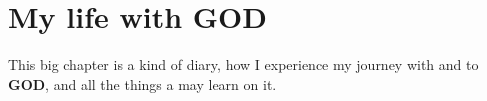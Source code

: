 \documentclass[12pt,a4paper]{article}
\newcommand{\God}[0]{\textbf{GOD}}
\newcommand{\Jesus}[0]{\textbf{JESUS}}
\newcommand{\q}[1]{\char"22{#1}\char"22 }
\begin{document}
	\section{My life with {\God}} \label{MeinLebenMitGott}
		This big chapter is a kind of diary,
		how I experience my journey with and to {\God},
		and all the things a may learn on it.
%	
\end{document}
